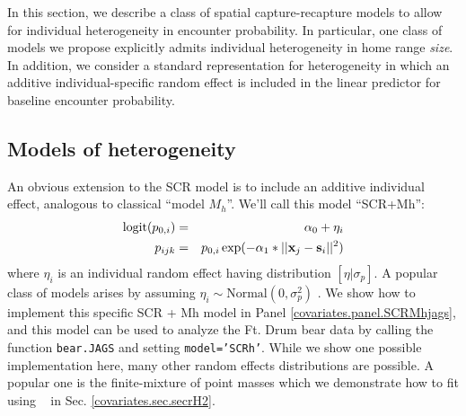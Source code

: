 In this section, we describe a class of spatial capture-recapture
models to allow for individual heterogeneity in encounter
probability.  In particular, one class of models we propose explicitly
admits individual heterogeneity in home range {\it size}. In addition,
we consider a standard representation for heterogeneity in which an
additive individual-specific random effect is included in the linear
predictor for baseline encounter probability.  

\subsection{Models of heterogeneity}
\label{covariates.sec.heterogeneity}

An obvious extension to the SCR model is to include an additive
individual effect, analogous to classical ``model $M_{h}$''. We'll
call this model ``SCR+Mh'':
\begin{eqnarray*}
\mbox{logit}(p_{0,i})& =& \alpha_0 + \eta_{i} \\
p_{ijk}& = &p_{0,i} \exp(- \alpha_1*||{\bf x}_{j}-{\bf s}_{i}||^2)
\end{eqnarray*}
where $\eta_{i}$ is an individual random effect having distribution
$[\eta|\sigma_{p}]$.  A popular class of models arises by assuming
$\eta_{i} \sim \mbox{Normal}(0,\sigma_{p}^{2})$ \citep{coull_agresti:1999,
dorazio_royle:2003}. 
We show how to implement this specific SCR + Mh model in 
Panel \ref{covariates.panel.SCRMhjags}, and this model can 
be used to analyze the Ft. Drum bear data by calling the function 
{\tt bear.JAGS} and setting {\tt model='SCRh'}.
While we show one possible implementation here, 
many other random effects
distributions are possible. A popular one is the finite-mixture of
point masses
\citep{norris_pollock:1996, pledger:2000} which 
we demonstrate how to fit using \secr~ in
Sec. \ref{covariates.sec.secrH2}.  

